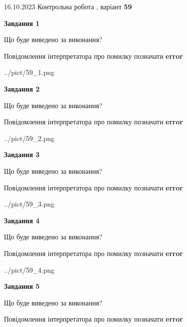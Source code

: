 \documentclass[12pt, ukrainian]{article}
\begin{document}
{\Large{16.10.2023 Контрольна робота , варіант  \No \textbf { 59 }\par}}
{
\begin {large}
{\begin {center}\textbf{Завдання 1}\end {center}}\par
Що буде виведено за виконання? \par
Повідомлення інтерпретатора про помилку позначати \textbf{error}

\begin{center}
	{../pict/59_1.png}
\end{center}
\newpage

{\begin {center}\textbf{Завдання 2}\end {center}}\par
Що буде виведено за виконання? \par
Повідомлення інтерпретатора про помилку позначати \textbf{error}

\begin{center}
	{../pict/59_2.png}
\end{center}
\newpage

{\begin {center}\textbf{Завдання 3}\end {center}}\par
Що буде виведено за виконання? \par
Повідомлення інтерпретатора про помилку позначати \textbf{error}

\begin{center}
	{../pict/59_3.png}
\end{center}
\newpage

{\begin {center}\textbf{Завдання 4}\end {center}}\par
Що буде виведено за виконання? \par
Повідомлення інтерпретатора про помилку позначати \textbf{error}

\begin{center}
	{../pict/59_4.png}
\end{center}
\newpage

{\begin {center}\textbf{Завдання 5}\end {center}}\par
Що буде виведено за виконання? \par
Повідомлення інтерпретатора про помилку позначати \textbf{error}


\end{large}}
\end{document}
